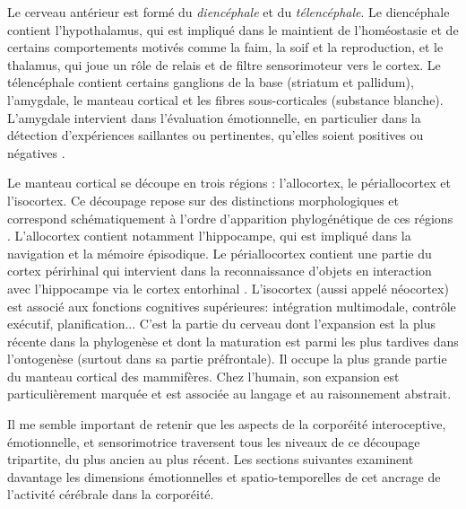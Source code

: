Le cerveau antérieur est formé du \emph{diencéphale} et du \emph{télencéphale}.
Le diencéphale contient l'hypothalamus, qui est impliqué dans le maintient de l'homéostasie et de certains comportements motivés comme la faim, la soif et la reproduction, et le thalamus, qui joue un rôle de relais et de filtre sensorimoteur vers le cortex.
Le télencéphale contient certains ganglions de la base (striatum et pallidum), l'amygdale, le manteau cortical et les fibres sous-corticales (substance blanche).
L'amygdale intervient dans l'évaluation émotionnelle, en particulier dans la détection d'expériences saillantes ou pertinentes, qu'elles soient positives ou négatives \cite{janak_circuits_2015}. 

Le manteau cortical se découpe en trois régions : l'allocortex, le périallocortex et l'isocortex.
Ce découpage repose sur des distinctions morphologiques et correspond schématiquement à l'ordre d'apparition phylogénétique de ces régions \cite{insausti_human_2017}.
L'allocortex contient notamment l'hippocampe, qui est impliqué dans la navigation et la mémoire épisodique. 
Le périallocortex contient une partie du cortex périrhinal qui intervient dans la reconnaissance d'objets en interaction avec l'hippocampe via le cortex entorhinal \cite{martin_perception_2023}.
L'isocortex (aussi appelé néocortex) est associé aux fonctions cognitives supérieures: intégration multimodale, contrôle exécutif, planification...
C'est la partie du cerveau dont l'expansion est la plus récente dans la phylogenèse et dont la maturation est parmi les plus tardives dans l'ontogenèse (surtout dans sa partie préfrontale).
Il occupe la plus grande partie du manteau cortical des mammifères.
Chez l'humain, son expansion est particulièrement marquée et est associée au langage et au raisonnement abstrait.



Il me semble important de retenir que les aspects de la corporéité interoceptive, émotionnelle, et sensorimotrice traversent tous les niveaux de ce découpage tripartite, du plus ancien au plus récent. 
Les sections suivantes examinent davantage les dimensions émotionnelles et spatio-temporelles de cet ancrage de l'activité cérébrale dans la corporéité. 



